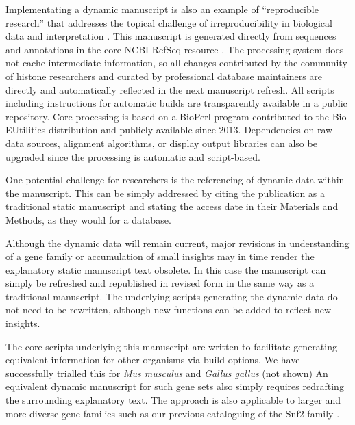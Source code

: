   Implementating a dynamic manuscript is also an example of ``reproducible research''
  \citep{reproducible-research-bioinformatics,reproducible-research-law}
  that addresses the topical challenge of irreproducibility in biological data
  and interpretation \citep{ErrorProne2012,OpenPrograms2012}.
  This manuscript is generated directly from sequences and annotations
  in the core NCBI RefSeq resource \citep{OLearyRefseq2016}.
  The processing system does not cache intermediate information,
  so all changes contributed by the community of histone researchers
  and curated by professional database maintainers
  are directly and automatically reflected in the next manuscript refresh.
  All scripts including instructions for automatic builds
  are transparently available in a public repository.
  Core processing is based on a BioPerl program contributed to the Bio-EUtilities distribution
  and publicly available since 2013.
  Dependencies on raw data sources, alignment algorithms, or display output libraries
  can also be upgraded since the processing is automatic and script-based.

  One potential challenge for researchers is the referencing of dynamic data within the manuscript.
  This can be simply addressed by citing the publication as a traditional static manuscript
  and stating the access date in their Materials and Methods, as they would for a database.

  Although the dynamic data will remain current,
  major revisions in understanding of a gene family or accumulation of small insights
  may in time render the explanatory static manuscript text obsolete.
  In this case the manuscript can simply be refreshed and republished in revised form
  in the same way as a traditional manuscript.
  The underlying scripts generating the dynamic data do not need to be rewritten, 
  although new functions can be added to reflect new insights.

  The core scripts underlying this manuscript are written to facilitate generating
  equivalent information for other organisms via build options.
  We have successfully trialled this for \textit{Mus musculus} and \textit{Gallus gallus} (not shown)
  An equivalent dynamic manuscript for such gene sets
  also simply requires redrafting the surrounding explanatory text.
  The approach is also applicable to larger and more diverse gene families such as
  our previous cataloguing of the Snf2 family \citep{andrew-snf2-catalogue}.
